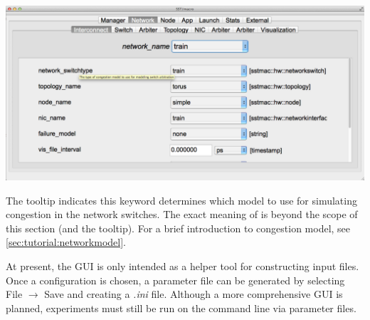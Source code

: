 \begin{center}
\includegraphics[width=1.0\textwidth]{figures/gui/networkswitchtooltip.pdf}
\end{center}
The tooltip indicates this keyword determines which model to use for simulating congestion in the network switches. 
The exact meaning of  is beyond the scope of this section (and the tooltip). 
For a brief introduction to congestion model, see \ref{sec:tutorial:networkmodel}.

At present, the GUI is only intended as a helper tool for constructing input files.  
Once a configuration is chosen, a parameter file can be generated by selecting File $\rightarrow$ Save and creating a \textit{.ini} file.  
Although a more comprehensive GUI is planned, experiments must still be run on the command line via parameter files.
